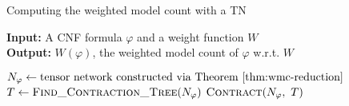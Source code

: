 \begin{algorithm}[t]
	\caption{Computing the weighted model count with a TN}\label{alg:wmc}
	\hspace*{\algorithmicindent} \textbf{Input:} A CNF formula $\varphi$ and a weight function $W$\\
	\hspace*{\algorithmicindent} \textbf{Output:} $W(\varphi)$, the weighted model count of $\varphi$ w.r.t. $W$
	\begin{algorithmic}[1]
	    \State $N_\varphi \gets \text{tensor network constructed via Theorem \ref{thm:wmc-reduction}}$
	    \State $T \gets \Call{Find\_Contraction\_Tree}{N_\varphi}$ 
	    \State \Return $\Call{Contract}{N_\varphi,~T}$
	\end{algorithmic}
\end{algorithm}



